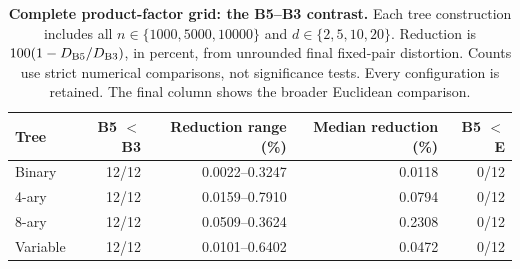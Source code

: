 \begin{table}[t]
\centering
\caption{\textbf{Complete product-factor grid: the B5--B3 contrast.} Each tree construction includes all $n\in\{1000,5000,10000\}$ and $d\in\{2,5,10,20\}$. Reduction is $100(1-D_{\rm B5}/D_{\rm B3})$, in percent, from unrounded final fixed-pair distortion. Counts use strict numerical comparisons, not significance tests. Every configuration is retained. The final column shows the broader Euclidean comparison.}
\label{tab:revision-synthetic-complete}
\footnotesize\setlength{\tabcolsep}{4.2pt}\renewcommand{\arraystretch}{1.12}
\begin{tabular}{lrrrr}
\toprule
Tree & B5 $<$ B3 & Reduction range (\%) & Median reduction (\%) & B5 $<$ E \\
\midrule
Binary & \cellcolor{oursbg}12/12 & 0.0022--0.3247 & 0.0118 & 0/12 \\
4-ary & \cellcolor{oursbg}12/12 & 0.0159--0.7910 & 0.0794 & 0/12 \\
8-ary & \cellcolor{oursbg}12/12 & 0.0509--0.3624 & 0.2308 & 0/12 \\
Variable & \cellcolor{oursbg}12/12 & 0.0101--0.6402 & 0.0472 & 0/12 \\
\bottomrule
\end{tabular}
\end{table}
